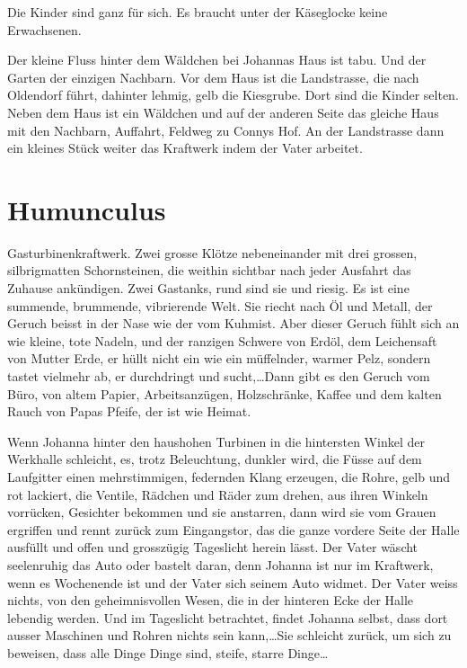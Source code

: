 \documentclass[10pt,a5paper]{book}
\begin{document}
Die Kinder sind ganz für sich. Es braucht unter der Käseglocke keine Erwachsenen. 

Der kleine Fluss hinter dem Wäldchen bei Johannas Haus ist tabu. Und der Garten der einzigen Nachbarn. Vor dem Haus ist die Landstrasse, die nach Oldendorf führt, dahinter lehmig, gelb die Kiesgrube. Dort sind die Kinder selten. Neben dem Haus ist ein Wäldchen und auf der anderen Seite das gleiche Haus mit den Nachbarn, Auffahrt, Feldweg zu Connys Hof. An der Landstrasse dann ein kleines Stück weiter das Kraftwerk indem der Vater arbeitet.



\section*{Humunculus}



Gasturbinenkraftwerk. Zwei grosse Klötze nebeneinander mit drei grossen, silbrigmatten Schornsteinen, die weithin sichtbar nach jeder Ausfahrt das Zuhause ankündigen. Zwei Gastanks, rund sind sie und riesig. Es ist eine summende, brummende, vibrierende Welt. Sie riecht nach Öl und Metall, der Geruch beisst in der Nase wie der vom Kuhmist. Aber dieser Geruch fühlt sich an wie kleine, tote Nadeln, und der ranzigen Schwere von Erdöl, dem Leichensaft von Mutter Erde, er hüllt nicht ein wie ein müffelnder, warmer Pelz, sondern tastet vielmehr ab, er durchdringt und sucht,\dots Dann gibt es den Geruch vom Büro, von altem Papier, Arbeitsanzügen, Holzschränke, Kaffee und dem kalten Rauch von Papas Pfeife, der ist wie Heimat.

Wenn Johanna hinter den haushohen Turbinen in die hintersten Winkel der Werkhalle schleicht, es, trotz Beleuchtung, dunkler wird, die Füsse auf dem Laufgitter einen mehrstimmigen, federnden Klang erzeugen, die Rohre, gelb und rot lackiert, die Ventile, Rädchen und Räder zum drehen, aus ihren Winkeln vorrücken, Gesichter bekommen und sie anstarren, dann wird sie vom Grauen ergriffen und rennt zurück zum Eingangstor, das die ganze vordere Seite der Halle ausfüllt und offen und grosszügig Tageslicht herein lässt. Der Vater wäscht seelenruhig das Auto oder bastelt daran, denn Johanna ist nur im Kraftwerk, wenn es Wochenende ist und der Vater sich seinem Auto widmet. Der Vater weiss nichts, von den geheimnisvollen Wesen, die in  der hinteren Ecke der Halle lebendig werden. Und im Tageslicht betrachtet, findet Johanna selbst, dass dort ausser Maschinen und Rohren nichts sein kann,\dots Sie schleicht zurück, um sich zu beweisen, dass alle Dinge Dinge sind, steife, starre Dinge\dots
\end{document}
